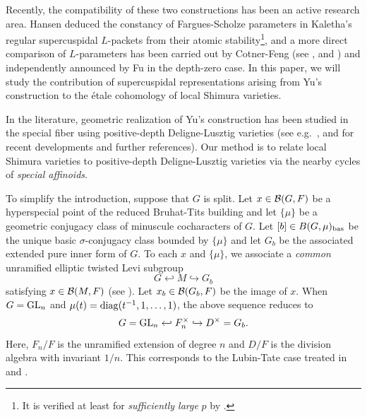 \documentclass[12pt,reqno]{amsart}
\begin{document}
Recently, the compatibility of these two constructions has been an active research area. Hansen \cite{Han26} deduced the constancy of Fargues-Scholze parameters in Kaletha's regular supercuspidal $L$-packets from their atomic stability\footnote{It is verified at least for \textit{sufficiently large} $p$ by \cite[Corollary 3.4.12]{Var24}.}, and a more direct comparison of $L$-parameters has been carried out by Cotner-Feng (see \cite{Cot26}, \cite{CF26_I} and \cite{CF26_II}) and independently announced by Fu in the depth-zero case. In this paper, we will study the contribution of supercuspidal representations arising from Yu's construction to the \'{e}tale cohomology of local Shimura varieties. %

In the literature, geometric realization of Yu's construction has been studied in the special fiber using positive-depth Deligne-Lusztig varieties (see e.g.\ \cite{CO25}, \cite{IN26} and \cite{Tak26_Yu} for recent developments and further references). Our method is to relate local Shimura varieties to positive-depth Deligne-Lusztig varieties via the nearby cycles of \textit{special affinoids}. 

To simplify the introduction, suppose that $G$ is split. Let $x \in {\mathcal{B}}(G, F)$ be a hyperspecial point of the reduced Bruhat-Tits building and let $\{ \mu \}$ be a geometric conjugacy class of minuscule cocharacters of $G$. Let $[b] \in B(G, \mu)_{\operatorname{bas}}$ be the unique basic $\sigma$-conjugacy class bounded by $\{\mu \}$ and let $G_b$ be the associated extended pure inner form of $G$. To each $x$ and $\{\mu\}$, we associate a \textit{common} unramified elliptic twisted Levi subgroup 
\[
    G \hookleftarrow M \hookrightarrow G_b
\]
satisfying $x \in {\mathcal{B}}(M, F)$ (see ). Let $x_b \in {\mathcal{B}}(G_b, F)$ be the image of $x$. When $G = {\operatorname{GL}}_n$ and $\mu(t) = {\operatorname{diag}}(t^{-1}, 1, \ldots, 1)$, the above sequence reduces to
\[
    G = {\operatorname{GL}}_n \hookleftarrow F_n^\times \hookrightarrow D^\times = G_b. 
\]
Here, $F_n / F$ is the unramified extension of degree $n$ and $D / F$ is the division algebra with invariant $1 / n$. This corresponds to the Lubin-Tate case treated in \cite{Yos10} and \cite{BW16}. 
\end{document}
